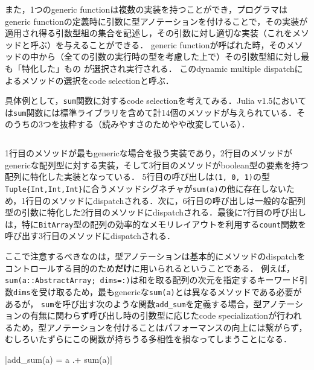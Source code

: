 また，1つのgeneric functionは複数の実装を持つことができ，プログラマはgeneric functionの定義時に引数に型アノテーションを付けることで，その実装が適用され得る引数型組の集合を記述し，その引数に対し適切な実装（これをメソッドと呼ぶ）を与えることができる．
generic functionが呼ばれた時，そのメソッドの中から（全ての引数の実行時の型を考慮した上で）その引数型組に対し最も「特化した」もの\footnotemark
が選択され実行される．
このdynamic multiple dispatchによるメソッドの選択をcode selectionと呼ぶ．


具体例として，\verb|sum|関数に対するcode selectionを考えてみる．Julia v1.5においては\verb|sum|関数には標準ライブラリを含めて計14個のメソッドが与えられている．そのうちの3つを抜粋する（読みやすさのためやや改変している）．

\inputminted[frame=lines, linenos]{julia}{src/sums_method.jl}

1行目のメソッドが最もgenericな場合を扱う実装であり，2行目のメソッドがgenericな配列型に対する実装，そして3行目のメソッドがboolean型の要素を持つ配列に特化した実装となっている．
5行目の呼び出しは\verb|(1, 0, 1)|の型\verb|Tuple{Int,Int,Int}|に合うメソッドシグネチャが\verb|sum(a)|の他に存在しないため，1行目のメソッドにdispatchされる．次に，6行目の呼び出しは一般的な配列型の引数に特化した2行目のメソッドにdispatchされる．最後に7行目の呼び出しは，特に\verb|BitArray|型の配列の効率的なメモリレイアウトを利用する\verb|count|関数を呼び出す3行目のメソッドにdispatchされる．

ここで注意するべきなのは，型アノテーションは基本的にメソッドのdispatchをコントロールする目的のため\textbf{だけ}に用いられるということである．
例えば，\verb|sum(a::AbstractArray; dims=:)|は和を取る配列の次元を指定するキーワード引数\verb|dims|を受け取るため，最もgenericな\verb|sum(a)|とは異なるメソッドである必要があるが\footnotemark[1]，
\verb|sum|を呼び出す次のような関数\verb|add_sum|を定義する場合，型アノテーションの有無に関わらず呼び出し時の引数型に応じたcode specializationが行われるため，型アノテーションを付けることはパフォーマンスの向上には繋がらず，むしろいたずらにこの関数が持ちうる多相性を損なってしまうことになる．\footnotemark[2]

|add_sum(a) = a .+ sum(a)|


